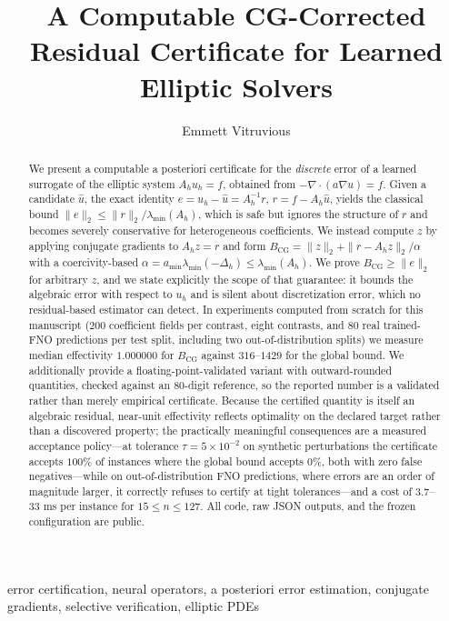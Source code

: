 \documentclass[journal]{IEEEtran}
\title{A Computable CG-Corrected Residual Certificate for Learned Elliptic Solvers}
\author{Emmett Vitruvious}
\theoremstyle{plain}
\theoremstyle{definition}
\begin{document}
\maketitle

\begin{abstract}
We present a computable a posteriori certificate for the \emph{discrete} error of a learned surrogate of the elliptic system $A_h u_h=f$, obtained from $-\nabla\cdot(a\nabla u)=f$. Given a candidate $\hat u$, the exact identity $e=u_h-\hat u=A_h^{-1}r$, $r=f-A_h\hat u$, yields the classical bound $\|e\|_2\le\|r\|_2/\lambda_{\min}(A_h)$, which is safe but ignores the structure of $r$ and becomes severely conservative for heterogeneous coefficients. We instead compute $z$ by applying conjugate gradients to $A_h z=r$ and form $B_{\mathrm{CG}}=\|z\|_2+\|r-A_hz\|_2/\alpha$ with a coercivity-based $\alpha=a_{\min}\lambda_{\min}(-\Delta_h)\le\lambda_{\min}(A_h)$. We prove $B_{\mathrm{CG}}\ge\|e\|_2$ for arbitrary $z$, and we state explicitly the scope of that guarantee: it bounds the algebraic error with respect to $u_h$ and is silent about discretization error, which no residual-based estimator can detect. In experiments computed from scratch for this manuscript ($200$ coefficient fields per contrast, eight contrasts, and $80$ real trained-FNO predictions per test split, including two out-of-distribution splits) we measure median effectivity $1.000000$ for $B_{\mathrm{CG}}$ against $316$--$1429$ for the global bound. We additionally provide a floating-point-validated variant with outward-rounded quantities, checked against an $80$-digit reference, so the reported number is a validated rather than merely empirical certificate. Because the certified quantity is itself an algebraic residual, near-unit effectivity reflects optimality on the declared target rather than a discovered property; the practically meaningful consequences are a measured acceptance policy---at tolerance $\tau=5\times10^{-2}$ on synthetic perturbations the certificate accepts $100\%$ of instances where the global bound accepts $0\%$, both with zero false negatives---while on out-of-distribution FNO predictions, where errors are an order of magnitude larger, it correctly refuses to certify at tight tolerances---and a cost of $3.7$--$33$ ms per instance for $15\le n\le127$. All code, raw JSON outputs, and the frozen configuration are public.
\end{abstract}

\begin{IEEEkeywords}
error certification, neural operators, a posteriori error estimation, conjugate gradients, selective verification, elliptic PDEs
\end{IEEEkeywords}
\end{document}
